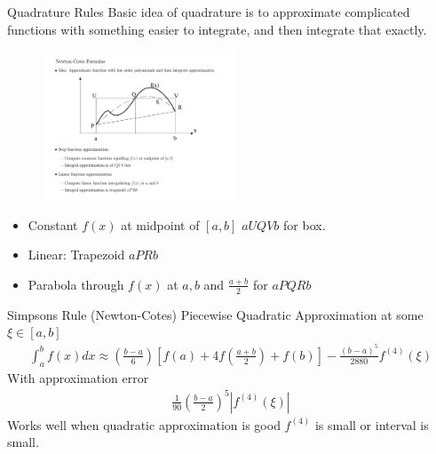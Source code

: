 \documentclass[xcolor=pdftex,dvipsnames,table,mathserif,aspectratio=169]{beamer}
\begin{document}
\begin{frame}{Quadrature Rules}
Basic idea of quadrature is to approximate complicated functions with something easier to integrate, and then integrate that exactly.\\
\begin{figure}[htbp]
\begin{center}
\includegraphics[height=1.75in]{./resources/quadrature.pdf}
\end{center}
\end{figure}
\begin{itemize}
\item Constant $f(x)$ at midpoint of $[a,b]$ $aUQVb$ for box.
\item Linear: Trapezoid $a PRb$
\item Parabola through $f(x)$ at $a,b$ and $\frac{a+b}{2}$ for $aPQRb$
\end{itemize}
\end{frame}

\begin{frame}{Simpsons Rule (Newton-Cotes)}
Piecewise Quadratic Approximation at some $\xi \in[a,b]$
\begin{eqnarray*}
\int_{a}^b f(x) d x \approx \left(\frac{b-a}{6} \right) \left[f(a) + 4f \left( \frac{a+b}{2} \right) + f(b) \right]  - \frac{(b-a)^5}{2880} f^{(4)} (\xi)
\end{eqnarray*}
With approximation error
\begin{eqnarray*}
\frac{1}{90} \left( \frac{b-a}{2}\right)^5 | f^{(4)} (\xi) |
\end{eqnarray*}
Works well when quadratic approximation is good $f^{(4)}$ is small or interval is small.
\end{frame}
\end{document}
